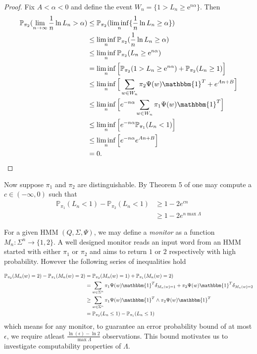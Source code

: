 \documentclass[a4paper,UKenglish,cleveref, autoref,mathscr]{lipics-v2019}
\newcommand{\PP}{\mathbb{P}}
\newcommand{\e}{\mathrm{e}}
\newcommand{\1}{\mathbbm{1}}
\begin{document}
\begin{proof}
Fix $A < \alpha < 0$ and define the event $W_n = \{1 > L_n \geq \e^{n\alpha}\}$. Then
\begin{align*}
\PP_{\pi_2}(\lim_{n \rightarrow \infty} \frac1n \ln L_n > \alpha) & \leq \PP_{\pi_2}(\liminf_n \{\frac1n \ln L_n \geq \alpha\}) \\
& \leq \liminf_n \PP_{\pi_2}(\frac1n \ln L_n \geq \alpha) \\
& \leq \liminf_n \PP_{\pi_2}(L_n \geq \e^{n\alpha}) \\
& = \liminf_n \Big[ \PP_{\pi_2}(1 > L_n \geq \e^{n\alpha}) +  \PP_{\pi_2}(L_n \geq 1) \Big]\\
& \leq \liminf_n \Big[ \sum_{w \in W_n} \pi_2 \Psi(w) \1^T + e^{An + B} \Big]\\
& \leq \liminf_n \Big[ e^{-n\alpha} \sum_{w \in W_n} \pi_1 \Psi(w) \1^T\Big]\\
& \leq \liminf_n \Big[ e^{-n\alpha} \PP_{\pi_1}(L_n < 1)\Big]\\
& \leq \liminf_n \Big[ e^{-n\alpha} e^{An + B}\Big]\\
& = 0.
\end{align*}
\end{proof}
Now suppose $\pi_1$ and $\pi_2$ are distinguishable.  By Theorem 5 of \cite{kief16} one may compute a $c \in (-\infty, 0)$ such that 
\begin{align*}
\PP_{\pi_1}(L_n < 1) - \PP_{\pi_2}(L_n < 1) & \geq 1 - 2e^{cn} \\
& \geq 1 - 2e^{n \max\Lambda }
\end{align*}

For a given HMM $(Q, \Sigma, \Psi)$, we may define a \emph{monitor} as a function $M_n : \Sigma^n \rightarrow \{1,2\}$. A well designed monitor reads an input word from an HMM started with either $\pi_1$ or $\pi_2$ and aims to return $1$ or $2$ respectively with high probability. However the following series of inequalities hold

\begin{align*}
\PP_{\pi_2}(M_n(w) = 2) - \PP_{\pi_1}(M_n(w) = 2)  &= \PP_{\pi_2}(M_n(w) = 1) + \PP_{\pi_1}(M_n(w) = 2) \\
& = \sum_{w \in \Sigma^n} \pi_1 \Psi(w) \1^T \delta_{M_n(w) = 1} + \pi_2 \Psi(w) \1^T \delta_{M_n(w) = 2} \\
& \geq \sum_{w \in \Sigma^n} \pi_1\Psi(w)\1^T \land \pi_2 \Psi(w) \1^T \\
& = \PP_{\pi_2}(L_n \leq 1) - \PP_{\pi_1}(L_n \leq 1)
\end{align*}
which means for any monitor, to guarantee an error probability bound of at most $\epsilon$, we require atleast $\frac{\ln(\epsilon) - \ln 2}{\max \Lambda}$ observations. This bound motivates us to investigate computability properties of $\Lambda$. 
\end{document}

